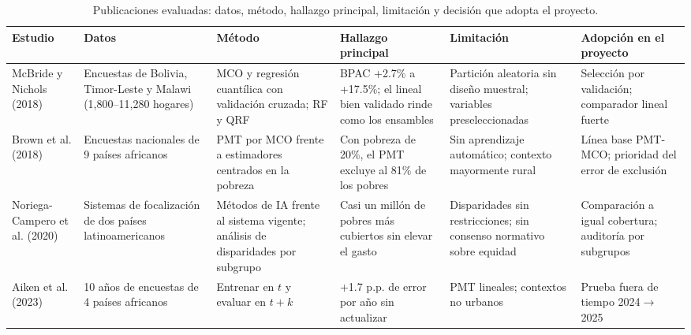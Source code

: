 \begin{table}[t]
\centering
\caption{Publicaciones evaluadas: datos, método, hallazgo principal, limitación y decisión que adopta el proyecto.}
\label{tab:papers}
\fontsize{7}{8.4}\selectfont
\setlength{\tabcolsep}{3.5pt}
\begin{tabular}{L{2.3cm}L{2.5cm}L{2.9cm}L{3.0cm}L{2.8cm}L{2.9cm}}
\toprule
\textbf{Estudio} & \textbf{Datos} & \textbf{Método} & \textbf{Hallazgo principal} & \textbf{Limitación} & \textbf{Adopción en el proyecto} \\
\midrule
McBride y Nichols (2018) \cite{mcbride2018retooling} & Encuestas de Bolivia, Timor-Leste y Malawi (1,800--11,280 hogares) & MCO y regresión cuantílica con validación cruzada; RF y QRF & BPAC +2.7\% a +17.5\%; el lineal bien validado rinde como los ensambles & Partición aleatoria sin diseño muestral; variables preseleccionadas & Selección por validación; comparador lineal fuerte \\
\addlinespace[2pt]
Brown et al. (2018) \cite{brown2018poor} & Encuestas nacionales de 9 países africanos & PMT por MCO frente a estimadores centrados en la pobreza & Con pobreza de 20\%, el PMT excluye al 81\% de los pobres & Sin aprendizaje automático; contexto mayormente rural & Línea base PMT-MCO; prioridad del error de exclusión \\
\addlinespace[2pt]
Noriega-Campero et al. (2020) \cite{noriega2020algorithmic} & Sistemas de focalización de dos países latinoamericanos & Métodos de IA frente al sistema vigente; análisis de disparidades por subgrupo & Casi un millón de pobres más cubiertos sin elevar el gasto & Disparidades sin restricciones; sin consenso normativo sobre equidad & Comparación a igual cobertura; auditoría por subgrupos \\
\addlinespace[2pt]
Aiken et al. (2023) \cite{aiken2023moving} & 10 años de encuestas de 4 países africanos & Entrenar en $t$ y evaluar en $t+k$ & +1.7 p.p. de error por año sin actualizar & PMT lineales; contextos no urbanos & Prueba fuera de tiempo 2024$\rightarrow$2025 \\
\bottomrule
\end{tabular}
\end{table}
